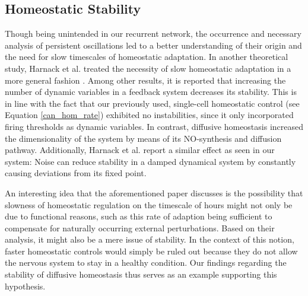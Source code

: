 \documentclass[10pt,a4paper]{article}
\begin{document}
\subsection{Homeostatic Stability}
Though being unintended in our recurrent network, the occurrence and necessary analysis of persistent oscillations led to a better understanding of their origin and the need for slow timescales of homeostatic adaptation. In another theoretical study, Harnack et al. treated the necessity of slow homeostatic adaptation in a more general fashion \cite{Stability_Homeostasis_Harnack_2015}. Among other results, it is reported that increasing the number of dynamic variables in a feedback system decreases its stability. This is in line with the fact that our previously used, single-cell homeostatic control (see Equation \eqref{can_hom_rate}) exhibited no instabilities, since it only incorporated firing thresholds as dynamic variables. In contrast, diffusive homeostasis increased the dimensionality of the system by means of its NO-synthesis and diffusion pathway. Additionally, Harnack et al. report a similar effect as seen in our system: Noise can reduce stability in a damped dynamical system by constantly causing deviations from its fixed point.

An interesting idea that the aforementioned paper discusses is the possibility that slowness of homeostatic regulation on the timescale of hours might not only be due to functional reasons, such as this rate of adaption being sufficient to compensate for naturally occurring external perturbations. Based on their analysis, it might also be a mere issue of stability. In the context of this notion, faster homeostatic controls would simply be ruled out because they do not allow the nervous system to stay in a healthy condition. Our findings regarding the stability of diffusive homeostasis thus serves as an example supporting this hypothesis.
\end{document}
